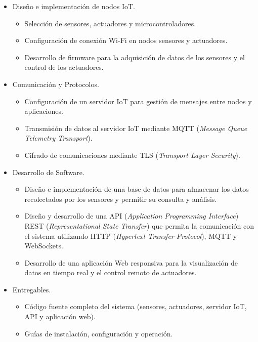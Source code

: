 \begin{itemize}
      \item Diseño e implementación de nodos IoT.
            \begin{itemize}
                  \item Selección de sensores, actuadores y microcontroladores.
                  \item Configuración de conexión Wi-Fi en nodos sensores y actuadores.
                  \item Desarrollo de firmware para la adquisición de datos de los sensores y el
                        control de los actuadores.
            \end{itemize}
\end{itemize}
\begin{itemize}
      \item Comunicación y Protocolos.
            \begin{itemize}
                  \item Configuración de un servidor IoT para gestión de mensajes entre nodos y
                        aplicaciones.
                  \item Transmisión de datos al servidor IoT mediante MQTT (\textit{Message Queue
                              Telemetry Transport}).
                  \item Cifrado de comunicaciones mediante TLS (\textit{Transport Layer Security}).
            \end{itemize}
\end{itemize}
\begin{itemize}
      \item Desarrollo de Software.
            \begin{itemize}
                  \item Diseño e implementación de una base de datos para almacenar los datos
                        recolectados por los sensores y permitir su consulta y análisis.
                  \item Diseño y desarrollo de una API (\textit{Application Programming Interface})
                        REST (\textit{Representational State Transfer}) que permita la comunicación con
                        el sistema utilizando HTTP (\textit{Hypertext Transfer Protocol}), MQTT y
                        WebSockets.
                  \item Desarrollo de una aplicación Web responsiva para la visualización de datos en
                        tiempo real y el control remoto de actuadores.
            \end{itemize}
\end{itemize}
\begin{itemize}
      \item Entregables.
            \begin{itemize}
                  \item Código fuente completo del sistema (sensores, actuadores, servidor IoT, API y
                        aplicación web).
                  \item Guías de instalación, configuración y operación.
            \end{itemize}
\end{itemize}

